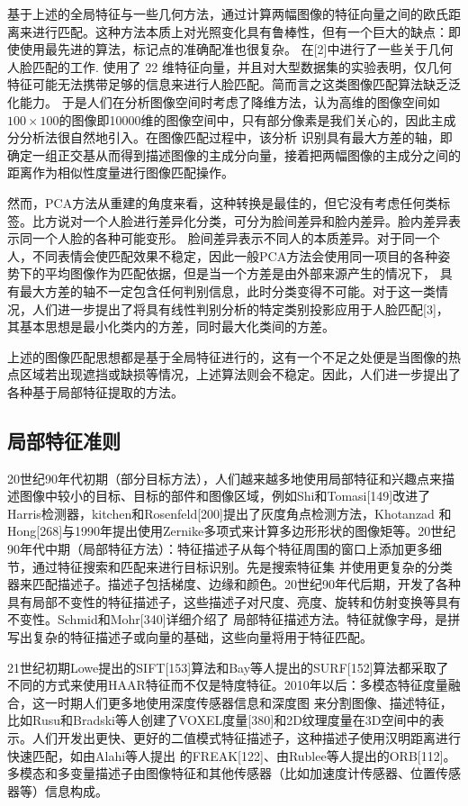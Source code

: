 基于上述的全局特征与一些几何方法，通过计算两幅图像的特征向量之间的欧氏距离来进行匹配。这种方法本质上对光照变化具有鲁棒性，但有一个巨大的缺点：即使使用最先进的算法，标记点的准确配准也很复杂。
在[2]中进行了一些关于几何人脸匹配的工作. 使用了 22 维特征向量，并且对大型数据集的实验表明，仅几何特征可能无法携带足够的信息来进行人脸匹配。简而言之这类图像匹配算法缺乏泛化能力。
于是人们在分析图像空间时考虑了降维方法，认为高维的图像空间如$100 \times 100$的图像即10000维的图像空间中，只有部分像素是我们关心的，因此主成分分析法很自然地引入。在图像匹配过程中，该分析
识别具有最大方差的轴，即确定一组正交基从而得到描述图像的主成分向量，接着把两幅图像的主成分之间的距离作为相似性度量进行图像匹配操作。

然而，PCA方法从重建的角度来看，这种转换是最佳的，但它没有考虑任何类标签。比方说对一个人脸进行差异化分类，可分为脸间差异和脸内差异。脸内差异表示同一个人脸的各种可能变形。
脸间差异表示不同人的本质差异。对于同一个人，不同表情会使匹配效果不稳定，因此一般PCA方法会使用同一项目的各种姿势下的平均图像作为匹配依据，但是当一个方差是由外部来源产生的情况下，
具有最大方差的轴不一定包含任何判别信息，此时分类变得不可能。对于这一类情况，人们进一步提出了将具有线性判别分析的特定类别投影应用于人脸匹配[3]，其基本思想是最小化类内的方差，同时最大化类间的方差。

上述的图像匹配思想都是基于全局特征进行的，这有一个不足之处便是当图像的热点区域若出现遮挡或缺损等情况，上述算法则会不稳定。因此，人们进一步提出了各种基于局部特征提取的方法。

\subsection{局部特征准则}

20世纪90年代初期（部分目标方法），人们越来越多地使用局部特征和兴趣点来描述图像中较小的目标、目标的部件和图像区域，例如Shi和Tomasi[149]改进了Harris检测器，kitchen和Rosenfeld[200]提出了灰度角点检测方法，Khotanzad
和Hong[268]与1990年提出使用Zernike多项式来计算多边形形状的图像矩等。20世纪90年代中期（局部特征方法）：特征描述子从每个特征周围的窗口上添加更多细节，通过特征搜索和匹配来进行目标识别。先是搜索特征集
并使用更复杂的分类器来匹配描述子。描述子包括梯度、边缘和颜色。20世纪90年代后期，开发了各种具有局部不变性的特征描述子，这些描述子对尺度、亮度、旋转和仿射变换等具有不变性。Schmid和Mohr[340]详细介绍了
局部特征描述方法。特征就像字母，是拼写出复杂的特征描述子或向量的基础，这些向量将用于特征匹配。

21世纪初期Lowe提出的SIFT[153]算法和Bay等人提出的SURF[152]算法都采取了不同的方式来使用HAAR特征而不仅是特度特征。2010年以后：多模态特征度量融合，这一时期人们更多地使用深度传感器信息和深度图
来分割图像、描述特征，比如Rusu和Bradski等人创建了VOXEL度量[380]和2D纹理度量在3D空间中的表示。人们开发出更快、更好的二值模式特征描述子，这种描述子使用汉明距离进行快速匹配，如由Alahi等人提出
的FREAK[122]、由Rublee等人提出的ORB[112]。多模态和多变量描述子由图像特征和其他传感器（比如加速度计传感器、位置传感器等）信息构成。

